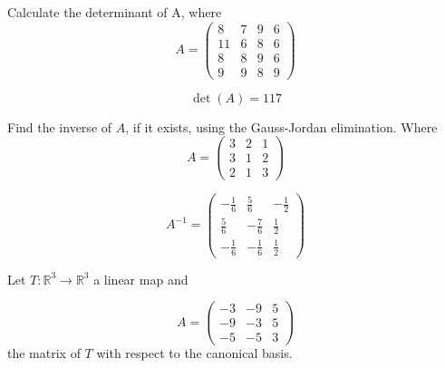 \begin{questions}

\question Calculate the determinant of A, where
$$
A=\left(\begin{array}{rrrr}
8 & 7 & 9 & 6 \\
11 & 6 & 8 & 6 \\
8 & 8 & 9 & 6 \\
9 & 9 & 8 & 9
\end{array}\right)
$$

\begin{solution}
$$\det(A)=117$$
\end{solution}

\question Find the inverse of $A$, if it exists, using the Gauss-Jordan elimination. Where
$$
A=\left(\begin{array}{rrr}
3 & 2 & 1 \\
3 & 1 & 2 \\
2 & 1 & 3
\end{array}\right)
$$

\begin{solution}
$$A^{-1}=\left(\begin{array}{rrr}
-\frac{1}{6} & \frac{5}{6} & -\frac{1}{2} \\
\frac{5}{6} & -\frac{7}{6} & \frac{1}{2} \\
-\frac{1}{6} & -\frac{1}{6} & \frac{1}{2}
\end{array}\right)$$
\end{solution}

\question Let $T:\mathbb{R}^3\rightarrow\mathbb{R}^3$  a linear map and
 
$$
A=\left(\begin{array}{rrr}
-3 & -9 & 5 \\
-9 & -3 & 5 \\
-5 & -5 & 3
\end{array}\right)
$$
the matrix of $T$ with respect to the canonical basis.
\end{questions}
